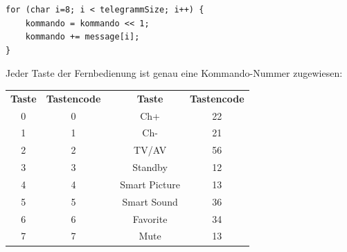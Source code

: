 \documentclass[12pt,a4paper,bibliography=totocnumbered,listof=totocnumbered]{scrartcl}
\begin{document}
\vspace{1em}
\begin{lstlisting}[caption=Berechnung der Kommando-Nummer]
for (char i=8; i < telegrammSize; i++) {
	kommando = kommando << 1;
	kommando += message[i];
}
\end{lstlisting}


Jeder Taste der Fernbedienung ist genau eine Kommando-Nummer zugewiesen:

\begin{table}[h]
	\centering
	
	
	\begin{tabular}{|c|c|c|c|c|}
		\cline{1-2} \cline{4-5}
		\textbf{Taste}                                   & \textbf{Tastencode} & \multicolumn{1}{l|}{} & \textbf{Taste}                        & \textbf{Tastencode} \\ \cline{1-2} \cline{4-5} \noalign{\smallskip} \cline{1-2} \cline{4-5}
		\cellcolor[gray]{.8}0 						 & 0                   &                       & \cellcolor[gray]{.8}Ch+           & 22                  \\ \cline{1-2} \cline{4-5} 
		\cellcolor[gray]{.8}1                        & 1                   &                       & \cellcolor[gray]{.8}Ch-           & 21                  \\ \cline{1-2} \cline{4-5} 
		\cellcolor[gray]{.8}2                        & 2                   &                       & \cellcolor[gray]{.8}TV/AV         & 56                  \\ \cline{1-2} \cline{4-5} 
		\cellcolor[gray]{.8}3                        & 3                   &                       & \cellcolor[gray]{.8}Standby       & 12                  \\ \cline{1-2} \cline{4-5} 
		\cellcolor[gray]{.8}4                        & 4                   &                       & \cellcolor[gray]{.8}Smart Picture & 13                  \\ \cline{1-2} \cline{4-5} 
		\cellcolor[gray]{.8}5                        & 5                   &                       & \cellcolor[gray]{.8}Smart Sound   & 36                  \\ \cline{1-2} \cline{4-5} 
		\cellcolor[gray]{.8}6                        & 6                   &                       & \cellcolor[gray]{.8}Favorite      & 34                  \\ \cline{1-2} \cline{4-5} 
		\cellcolor[gray]{.8}7                        & 7                   &                       & \cellcolor[gray]{.8}Mute          & 13                  \\ \cline{1-2} \cline{4-5} 

\end{tabular}
\end{table}
\end{document}
